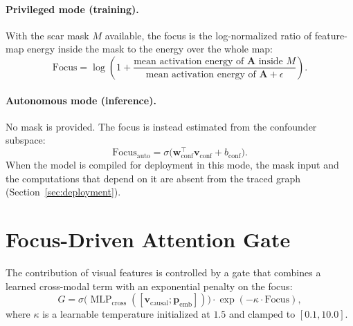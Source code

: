 \paragraph{Privileged mode (training).} With the scar mask $M$ available, the focus is the log-normalized ratio of feature-map energy inside the mask to the energy over the whole map:
\begin{equation}
\text{Focus} = \log\!\left(1 + \frac{\text{mean activation energy of } \mathbf{A} \text{ inside } M}{\text{mean activation energy of } \mathbf{A} + \epsilon}\right).
\end{equation}

\paragraph{Autonomous mode (inference).} No mask is provided. The focus is instead estimated from the confounder subspace:
\begin{equation}
\text{Focus}_{\text{auto}} = \sigma\bigl(\mathbf{w}_{\text{conf}}^{\top}\mathbf{v}_{\text{conf}} + b_{\text{conf}}\bigr).
\end{equation}
When the model is compiled for deployment in this mode, the mask input and the computations that depend on it are absent from the traced graph (Section~\ref{sec:deployment}).

\section{Focus-Driven Attention Gate}
The contribution of visual features is controlled by a gate that combines a learned cross-modal term with an exponential penalty on the focus:
\begin{equation}
G = \sigma\!\bigl(\operatorname{MLP}_{\text{cross}}([\mathbf{v}_{\text{causal}}; \mathbf{p}_{\text{emb}}])\bigr) \cdot \exp(-\kappa \cdot \text{Focus}),
\end{equation}
where $\kappa$ is a learnable temperature initialized at $1.5$ and clamped to $[0.1, 10.0]$.

